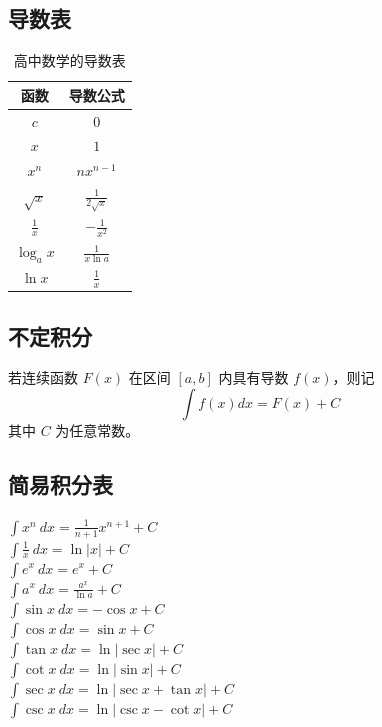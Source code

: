 \documentclass{article}
\begin{document}
\subsection{导数表}
\begin{table}[htbp]
    \centering
    \renewcommand{\arraystretch}{1.8} %
    \begin{tabular}{|c|c|}
        \hline
        函数 & 导数公式\\
        \hline
        $c$ & $0$\\
        \hline
        $x$ & $1$\\
        \hline
        $x^n$ & $nx^{n-1}$\\
        \hline
        $\sqrt x$ & $\frac{1}{2\sqrt{x}}$\\
        \hline
        $\frac{1}{x}$ & $-\frac{1}{x^2}$\\
        \hline
        $\log_a x$ & $\frac{1}{x\ln a}$\\
        \hline
        $\ln x$ & $\frac{1}{x}$\\
        \hline
    \end{tabular}   %
    \caption{高中数学的导数表}
\end{table}

\subsection{不定积分}
若连续函数 $F(x)$ 在区间 $[a,b]$ 内具有导数 $f(x)$，则记
$$ \int f(x) dx = F(x) + C $$
其中 $C$ 为任意常数。

\subsection{简易积分表}
$ \int x^n \ dx = \frac{1}{n+1} x^{n+1} + C $   \\
$ \int \frac{1}{x} \ dx = \ln |x| + C $   \\
$ \int e^x \ dx = e^x + C $   \\
$ \int a^x \ dx = \frac{a^x}{\ln a} + C $   \\
$ \int \sin x \ dx = -\cos x + C $   \\
$ \int \cos x \ dx = \sin x + C $   \\
$ \int \tan x \ dx = \ln |\sec x| + C $   \\
$ \int \cot x \ dx = \ln |\sin x| + C $   \\
$ \int \sec x \ dx = \ln |\sec x + \tan x| + C $   \\
$ \int \csc x \ dx = \ln |\csc x - \cot x| + C $   \\
\end{document}
